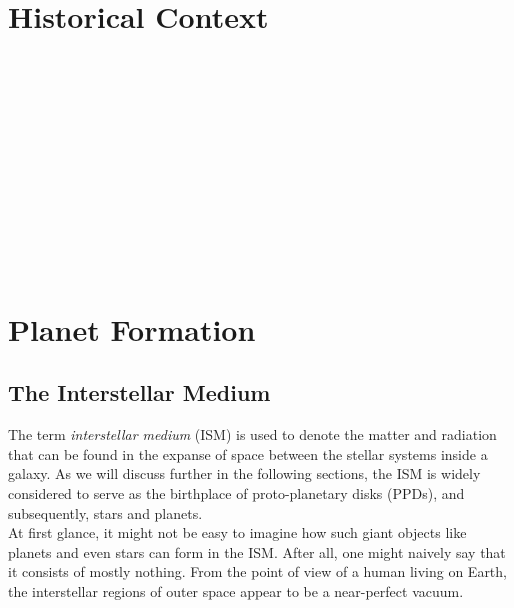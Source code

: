 \section{Historical Context}

     \\
     \\
     \\
     \\
     \\
     \\
     \\
     \\
     \\
     \\
     \\
        
\section{Planet Formation}

    \subsection{The Interstellar Medium}

        The term \textit{interstellar medium} (ISM) is used to denote the matter and radiation that 
        can be found in the expanse of space between the stellar systems inside a galaxy. 
        As we will discuss further in the following sections, the ISM is widely considered to serve 
        as the birthplace of proto-planetary disks (PPDs), and subsequently, stars and planets. \\

        At first glance, it might not be easy to imagine how such giant objects like planets and 
        even stars can form in the ISM. After all, one might naively say that it consists of mostly
        nothing. From the point of view of a human living on Earth, the interstellar regions of
        outer space appear to be a near-perfect vacuum. \\

